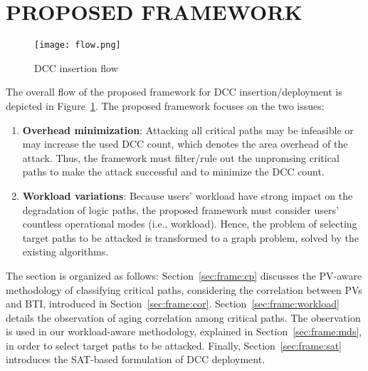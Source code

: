 
\section{PROPOSED FRAMEWORK}
\label{sec:frame}
\begin{figure}
	\centering
	\texttt{[image: flow.png]}
	\caption{DCC insertion flow}
	\label{fig:flow}
\end{figure}
\begin{comment}
\begin{figure}
	\centering
	\texttt{[image: pathset.png]}
	\caption{Classification of critical paths}
	\label{fig:set}
\end{figure}
\end{comment}
The overall flow of the proposed framework for DCC insertion/deployment is depicted in Figure~\ref{fig:flow}. The proposed framework focuses on the two issues: 
\begin{enumerate}
	\item \textbf{Overhead minimization}: Attacking all critical paths may be infeasible or may increase the used DCC count, which denotes the area overhead of the attack. Thus, the framework must filter/rule out the unpromsing critical paths to make the attack successful and to minimize the DCC count. 
	\item \textbf{Workload variations}: Because users' workload have strong impact on the degradation of logic paths, the proposed framework must consider users' countless operational modes (i.e., workload). Hence, the problem of selecting target paths to be attacked is transformed to a graph problem, solved by the existing algorithms. 
\end{enumerate}


The section is organized as follows: Section~\ref{sec:frame:cp} discusses the PV-aware methodology of classifying critical paths, considering the correlation between PVs and BTI, introduced in Section~\ref{sec:frame:cor}. Section~\ref{sec:frame:workload} details the observation of aging correlation among critical paths. The observation is used in our workload-aware methodology, explained in Section~\ref{sec:frame:mds}, in order to select target paths to be attacked. Finally, Section~\ref{sec:frame:sat} introduces the SAT-based formulation of DCC deployment.

